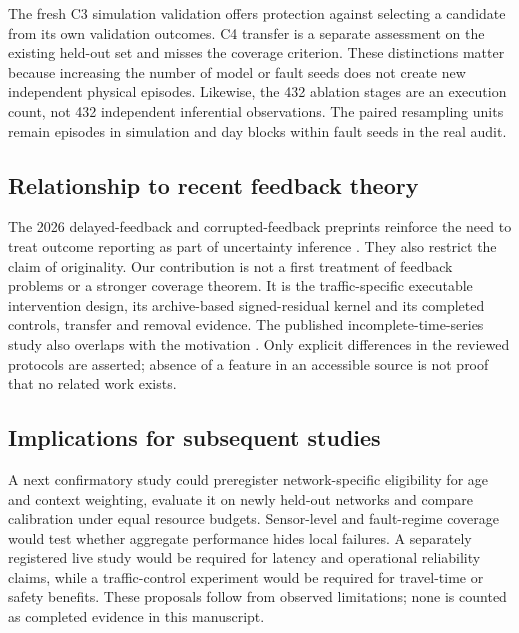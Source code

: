 The fresh C3 simulation validation offers protection against selecting a candidate from its own validation outcomes. C4 transfer is a separate assessment on the existing held-out set and misses the coverage criterion. These distinctions matter because increasing the number of model or fault seeds does not create new independent physical episodes. Likewise, the 432 ablation stages are an execution count, not 432 independent inferential observations. The paired resampling units remain episodes in simulation and day blocks within fault seeds in the real audit.

\subsection{Relationship to recent feedback theory}
The 2026 delayed-feedback and corrupted-feedback preprints reinforce the need to treat outcome reporting as part of uncertainty inference \citep{elhalabi2026,wang2026}. They also restrict the claim of originality. Our contribution is not a first treatment of feedback problems or a stronger coverage theorem. It is the traffic-specific executable intervention design, its archive-based signed-residual kernel and its completed controls, transfer and removal evidence. The published incomplete-time-series study also overlaps with the motivation \citep{chen2026}. Only explicit differences in the reviewed protocols are asserted; absence of a feature in an accessible source is not proof that no related work exists.

\subsection{Implications for subsequent studies}
A next confirmatory study could preregister network-specific eligibility for age and context weighting, evaluate it on newly held-out networks and compare calibration under equal resource budgets. Sensor-level and fault-regime coverage would test whether aggregate performance hides local failures. A separately registered live study would be required for latency and operational reliability claims, while a traffic-control experiment would be required for travel-time or safety benefits. These proposals follow from observed limitations; none is counted as completed evidence in this manuscript.
